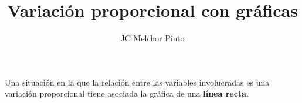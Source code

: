 \documentclass[12pt,addpoints,answers]{guia}
\title{Variación proporcional con gráficas}
\author{JC Melchor Pinto}
\begin{document}
\INFO%
%
\ejemplosboxed[]
\begin{questions}
    \questionboxed[20]{}
    \ejemplosboxed[]
    \questionboxed[20]{}
    \begin{importantbox}
        Una situación en la que la relación entre las variables involucradas es una variación
        proporcional tiene asociada la gráfica de una \textbf{línea recta}.
    \end{importantbox}
    \questionboxed[20]{}
    \questionboxed[20]{}
    \questionboxed[20]{}
\end{questions}
\end{document}
